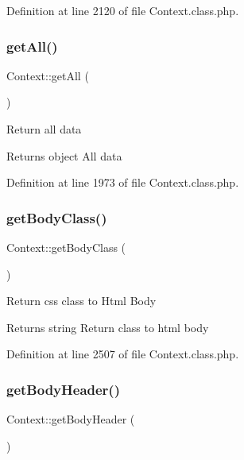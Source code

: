 Definition at line 2120 of file Context.\+class.\+php.

\mbox{\label{classContext_a89ad6fd5c093e257e82822d16dc67ac4}} 
\subsubsection{\texorpdfstring{get\+All()}{getAll()}}
{\footnotesize\ttfamily Context\+::get\+All (\begin{DoxyParamCaption}{ }\end{DoxyParamCaption})}

Return all data

\begin{DoxyReturn}{Returns}
object All data 
\end{DoxyReturn}


Definition at line 1973 of file Context.\+class.\+php.

\mbox{\label{classContext_a6562a2a894b2142362640e512bcf4e09}} 
\subsubsection{\texorpdfstring{get\+Body\+Class()}{getBodyClass()}}
{\footnotesize\ttfamily Context\+::get\+Body\+Class (\begin{DoxyParamCaption}{ }\end{DoxyParamCaption})}

Return css class to Html Body

\begin{DoxyReturn}{Returns}
string Return class to html body 
\end{DoxyReturn}


Definition at line 2507 of file Context.\+class.\+php.

\mbox{\label{classContext_a991c9fc6985b78d817b6771092913975}} 
\subsubsection{\texorpdfstring{get\+Body\+Header()}{getBodyHeader()}}
{\footnotesize\ttfamily Context\+::get\+Body\+Header (\begin{DoxyParamCaption}{ }\end{DoxyParamCaption})}

